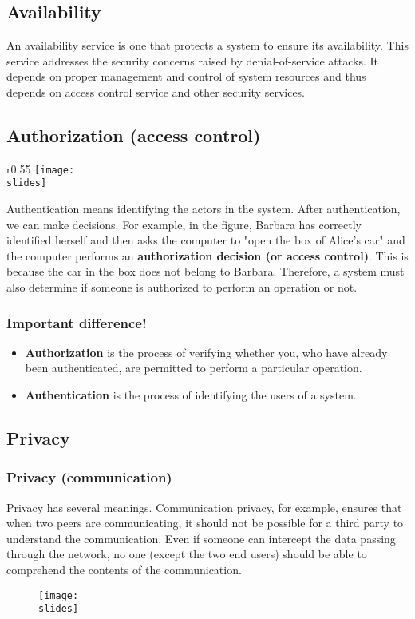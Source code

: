 \subsection{Availability}
An availability service is one that protects a system to ensure its availability. This service addresses the security
concerns raised by denial-of-service attacks. It depends on proper management and control of system resources
and thus depends on access control service and other security services.


\subsection{Authorization (access control)}
\begin{wrapfigure}{r}{0.55\textwidth}
  \centering
  \texttt{[image: \\slides]}
\end{wrapfigure}
Authentication means identifying the actors in the system. After authentication, we can make decisions. For example, in the figure, Barbara has correctly identified herself and then asks the computer to "open the box of Alice's car" and the computer performs an \textbf{authorization decision (or access control)}. This is because the car in the box does not belong to Barbara. Therefore, a system must also determine if someone is authorized to perform an operation or not.

\subsubsection{Important difference!}
\begin{itemize}
  \item \textbf{Authorization} is the process of verifying whether you, who have already been authenticated, are permitted to perform a particular operation.
  \item \textbf{Authentication} is the process of identifying the users of a system.
\end{itemize}


\subsection{Privacy}
\subsubsection{Privacy (communication)}
Privacy has several meanings.
Communication privacy, for example, ensures that when two peers are communicating, it should not be possible for a third party to understand the communication.
Even if someone can intercept the data passing through the network, no one (except the two end users) should be able to comprehend the contents of the communication.
\begin{figure}[h]
  \centering
  \texttt{[image: \\slides]}
\end{figure}

